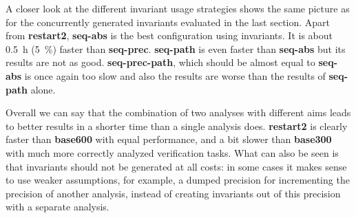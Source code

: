 A closer look at the different invariant usage strategies shows the same picture as for the concurrently generated invariants evaluated in the last section. Apart from \textbf{restart2}, \textbf{seq-abs} is 
the best configuration using invariants. It is about \SI{0.5}{\hour} (\SI{5}{\percent}) faster than \textbf{seq-prec}. \textbf{seq-path} is even faster than \textbf{seq-abs} but its results are not as good. \textbf{seq-prec-path}, which 
should be almost equal to \textbf{seq-abs} is once again too slow and also the results are worse than the results of \textbf{seq-path} alone.

Overall we can say that the combination of two analyses with different aims leads to better results in a shorter time than a single analysis does. \textbf{restart2} is clearly faster than \textbf{base600} 
with equal performance, and a bit slower than \textbf{base300} with much more correctly analyzed verification tasks. What can also be seen is that invariants should not be generated at all costs: in some cases it makes
sense to use weaker assumptions, for example, a dumped precision for incrementing the precision of another analysis, instead of creating invariants out of this precision with a separate analysis.